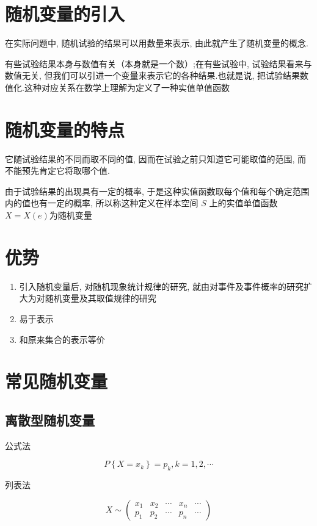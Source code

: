 
\section{随机变量的引入}

在实际问题中, 随机试验的结果可以用数量来表示, 由此就产生了随机变量的概念.

有些试验结果本身与数值有关（本身就是一个数）;在有些试验中, 试验结果看来与数值无关, 但我们可以引进一个变量来表示它的各种结果.也就是说, 把试验结果数值化.这种对应关系在数学上理解为定义了一种实值单值函数

\section{随机变量的特点}

它随试验结果的不同而取不同的值, 因而在试验之前只知道它可能取值的范围, 而不能预先肯定它将取哪个值.

由于试验结果的出现具有一定的概率, 于是这种实值函数取每个值和每个确定范围内的值也有一定的概率, 所以称这种定义在样本空间 $S$ 上的实值单值函数 $X= X(e)$为随机变量

\section{优势}

\begin{enumerate}
    \item 引入随机变量后, 对随机现象统计规律的研究, 就由对事件及事件概率的研究扩大为对随机变量及其取值规律的研究
    \item 易于表示
    \item 和原来集合的表示等价
\end{enumerate}

\section{常见随机变量}

\subsection{离散型随机变量}

公式法

$$
{P}\left\{{X}={x}_{k}\right\}={p}_{k}, {k}=1,2, \cdots
$$

列表法
  
$$X \sim\left(\begin{array}{lllll}x_{1} & x_{2} & \cdots & x_{n} & \cdots \\ p_{1} & p_{2} & \cdots & p_{n} & \cdots\end{array}\right)$$


